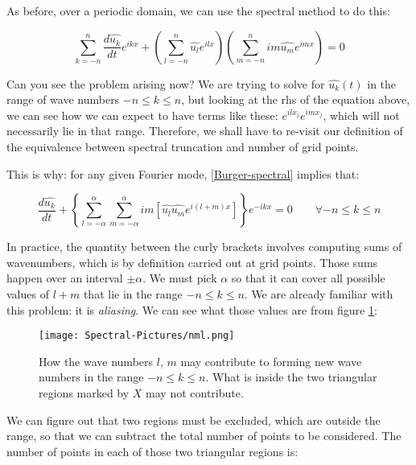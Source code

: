 As before, over a periodic domain, we can use the spectral method to do this:

\begin{equation}
	\sum_{k=-n}^{n} 	\frac{d \widehat{u_k}}{d t}  e^{ikx} +  \left( \sum_{l=-n}^{n}  \widehat{u_l} e^{ilx} \right)  \left(  \sum_{m=-n}^{n} 	im \widehat{u_m} e^{imx} \right)  = 0
	\label{Burger-spectral}
\end{equation}

Can you see the problem arising now? We are trying to solve for $\widehat{u_k}(t)$ in the range of wave numbers $-n \le k \le n$, but looking at the rhs of the equation above, we can see how we can expect to have terms like these: $e^{ilx_j}e^{imx_j}$, which will not necessarily lie in that range. Therefore, we shall have to re-visit our definition of the equivalence between spectral truncation and number of grid points.

This is why: for any given Fourier mode, \ref{Burger-spectral} implies that:

\begin{equation}
		\frac{d \widehat{u_k}}{d t}  +  \left\{ \sum_{l=-\alpha}^{\alpha} \sum_{m=-\alpha}^{\alpha}	im \left[    \widehat{u_l}  \widehat{u_m}  e^{i(l+m)x} \right]  \right\} e^{-ikx} = 0      \qquad  \forall -n \le k \le n
\end{equation}

In practice, the quantity between the curly brackets involves computing sums of wavenumbers, which is by definition carried out at grid points. Those sums happen over an interval $\pm \alpha$. We must pick $\alpha$ so that it can cover all possible values of $l+m$ that lie in the range $-n \le k \le n$. We are already familiar with this problem: it is \emph{aliasing}. We can see what those values are from figure \ref{fig:nlm}:

\begin{figure}[h!]
	\begin{center}
	\texttt{[image: Spectral-Pictures/nml.png]}
	\end{center}
	\label{fig:nlm}
	\caption{How the wave numbers $l$, $m$ may contribute to forming new wave numbers in the range  $-n \le k \le n$. What is inside the two triangular regions marked by $X$ may not contribute.}
	\end{figure}

We can figure out that two regions must be excluded, which are outside the range, so that we can subtract the total number of points to be considered. The number of points in each of those two triangular regions is:

